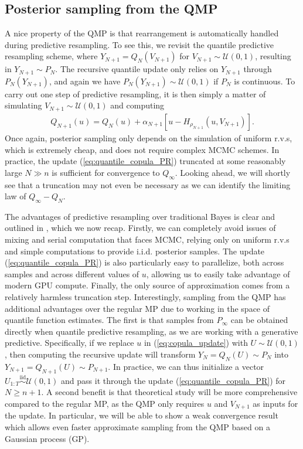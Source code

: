 \documentclass[11pt,a4paper]{article}
\newcommand{\iid}{\overset{\mathrm{iid}}{\sim}}
\begin{document}
\subsection{Posterior sampling from the QMP}
A nice property of the QMP is that rearrangement is automatically handled during predictive resampling. To see this, we revisit the quantile predictive resampling scheme, where $Y_{N+1} = Q_N(V_{N+1})$ for $V_{N+1} \sim\mathcal{U}(0,1)$, resulting in $Y_{N+1} \sim P_N$. The recursive quantile update only relies on $Y_{N+1}$ through $P_N\left(Y_{N+1}\right)$, 
and again we have $P_N\left(Y_{N+1}\right) \sim \mathcal{U}(0,1)$ if $P_N$ is continuous. 
To carry out one step of predictive resampling, it is then simply a matter of simulating $V_{N+1} \sim \mathcal{U}(0,1)$ and computing
\begin{align}\label{eq:quantile_copula_PR}
    Q_{N+1}(u) = Q_N(u) + \alpha_{N+1}\left[u - H_{\rho_{N+1}}\left(u, V_{N+1}\right)\right].
\end{align}
Once again, posterior sampling only depends on the simulation of uniform r.v.s, which is extremely cheap, and does not require complex MCMC schemes. In practice, the update (\ref{eq:quantile_copula_PR}) truncated at some reasonably large $N \gg n$ is sufficient for convergence to $Q_\infty$. Looking ahead, we will shortly see that a truncation may not even be necessary as we can identify the limiting law of $Q_{\infty} - Q_N$.

The advantages of predictive resampling over traditional Bayes is clear and outlined in \cite{Fong2023a}, which we now recap. Firstly, we can completely avoid issues of mixing and serial computation that faces MCMC, relying only on uniform r.v.s and simple computations to provide i.i.d. posterior samples. The update (\ref{eq:quantile_copula_PR}) is also particularly easy to parallelize, both across samples and across different values of $u$, allowing us to easily take advantage of modern GPU compute.  Finally, the only source of approximation comes from a relatively harmless truncation step.
Interestingly, sampling from the QMP has additional advantages over the regular MP due to working in the space of quantile function estimates. The first is that samples from $P_{\infty}$ can be obtained directly when quantile predictive resampling, as we are working with a generative predictive. Specifically, if we replace $u$ in (\ref{eq:copula_update}) with $U\sim \mathcal{U}(0,1)$, then computing the recursive update will transform $Y_N = Q_N(U) \sim P_N$ into $Y_{N+1} = Q_{N+1}(U) \sim P_{N+1}$. In practice, we can thus initialize a vector $U_{1:T}\iid \mathcal{U}(0,1)$ and pass it through the update (\ref{eq:quantile_copula_PR}) for $N\geq n+1$. 
A second benefit is that theoretical study will be more comprehensive compared to the regular MP, as the QMP only requires $u$ and $V_{N+1}$ as inputs for the update. In particular, we will be able to show a weak convergence result which allows even faster approximate sampling from the QMP based on a Gaussian process (GP). 
\end{document}
